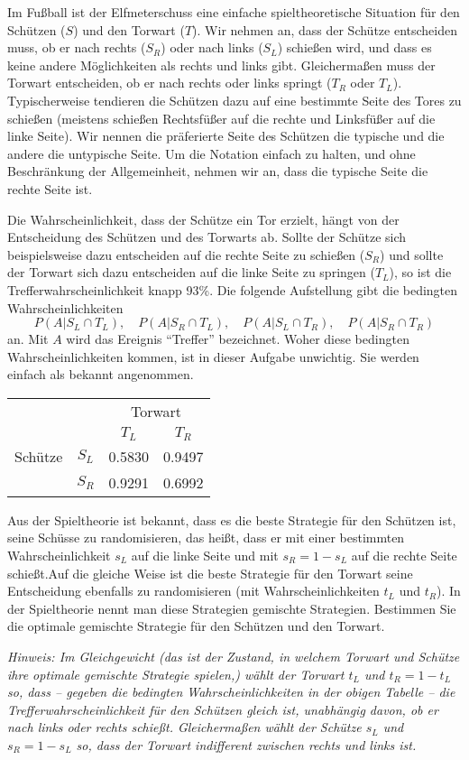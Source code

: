 \begin{Exercise}
Im Fußball ist der Elfmeterschuss eine einfache spieltheoretische Situation für den Schützen ($S$) und den Torwart ($T$). Wir nehmen an, dass der Schütze entscheiden muss, ob er nach rechts ($S_R$) oder nach links ($S_L$) schießen wird, und dass es keine andere Möglichkeiten als rechts und links gibt. Gleichermaßen muss der Torwart entscheiden, ob er nach rechts oder links springt ($T_R$ oder $T_L$). Typischerweise tendieren die Schützen dazu auf eine bestimmte Seite des Tores zu schießen (meistens schießen Rechtsfüßer auf die rechte und Linksfüßer auf die linke Seite). Wir nennen die präferierte Seite des Schützen die typische und die andere die untypische Seite. Um die Notation einfach zu halten, und ohne Beschränkung der Allgemeinheit, nehmen wir an, dass die typische Seite die rechte Seite ist. 

Die Wahrscheinlichkeit, dass der Schütze ein Tor erzielt, hängt von der Entscheidung des Schützen und des Torwarts ab. Sollte der Schütze sich beispielsweise dazu entscheiden auf die rechte Seite zu schießen ($S_R$) und sollte der Torwart sich dazu entscheiden auf die linke Seite zu springen ($T_L$), so ist die Trefferwahrscheinlichkeit knapp 93\%. Die folgende Aufstellung gibt die bedingten Wahrscheinlichkeiten
\[
P(A|S_L\cap T_L),\quad P(A|S_R\cap T_L),\quad P(A|S_L\cap T_R),\quad P(A|S_R\cap T_R)
\]
an. Mit $A$ wird das Ereignis ``Treffer'' bezeichnet. Woher diese bedingten Wahrscheinlichkeiten kommen, ist in dieser Aufgabe unwichtig. Sie werden einfach als bekannt angenommen.

\begin{center}
	\begin{tabular}{cc|cc}
		&  & \multicolumn{2}{|c}{Torwart} \\
		&  & $T_L$ & $T_R$ \\ \cline{2-4}
		Schütze& $S_L$ & 0.5830 & 0.9497 \\
		& $S_R$ & 0.9291 & 0.6992
	\end{tabular}
\end{center}

Aus der Spieltheorie ist bekannt, dass es die beste Strategie für den Schützen ist, seine Schüsse zu randomisieren, das heißt, dass er mit einer bestimmten Wahrscheinlichkeit $s_L$ auf die linke Seite und mit $s_R=1-s_L$ auf die rechte Seite schießt.Auf die gleiche Weise ist die beste Strategie für den Torwart seine Entscheidung ebenfalls zu randomisieren (mit Wahrscheinlichkeiten $t_L$ und $t_R$). In der Spieltheorie nennt man diese Strategien gemischte Strategien.
Bestimmen Sie die optimale gemischte Strategie für den Schützen und den Torwart.

\textit{Hinweis: Im Gleichgewicht (das ist der Zustand, in welchem Torwart und Schütze ihre optimale gemischte Strategie spielen,) wählt der Torwart $t_L$ und $t_R=1-t_L$ so, dass -- gegeben die bedingten Wahrscheinlichkeiten in der obigen Tabelle -- die Trefferwahrscheinlichkeit für den Schützen gleich ist, unabhängig davon, ob er nach links oder rechts schießt. Gleichermaßen wählt der Schütze $s_L$ und $s_R=1-s_L$ so, dass der Torwart indifferent zwischen rechts und links ist.}
\end{Exercise}

